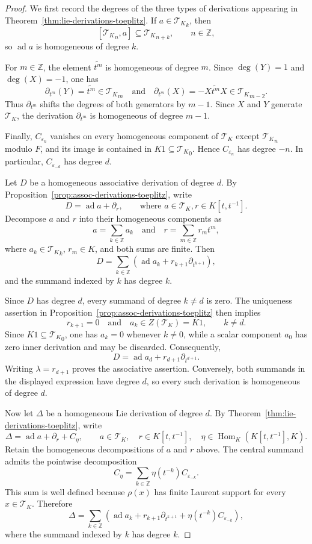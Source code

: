 \documentclass[11pt]{article}
\numberwithin{equation}{section}
\theoremstyle{plain}
\theoremstyle{definition}
\numberwithin{equation}{section}
\newcommand{\T}{\mathscr T_K}
\begin{document}
\begin{proof}
We first record the degrees of the three types of derivations appearing in Theorem~\ref{thm:lie-derivations-toeplitz}. If $a\in{\T}_k$, then
$$
[{\T}_n,a]\subseteq{\T}_{n+k},
\qquad n\in\mathbb Z,
$$
so $\operatorname{ad}a$ is homogeneous of degree $k$.

For $m\in\mathbb Z$, the element $\widetilde{t^m}$ is homogeneous of degree $m$. Since $\deg(Y)=1$ and $\deg(X)=-1$, one has
$$
\partial_{t^m}(Y)=\widetilde{t^m}\in{\T}_m
\quad\text{and}\quad
\partial_{t^m}(X)=-X\widetilde{t^m}X\in{\T}_{m-2}.
$$
Thus $\partial_{t^m}$ shifts the degrees of both generators by $m-1$. Since $X$ and $Y$ generate $\T$, the derivation $\partial_{t^m}$ is homogeneous of degree $m-1$.

Finally, $C_{\varepsilon_n}$ vanishes on every homogeneous component of $\T$ except ${\T}_n$ modulo $F$, and its image is contained in $K1\subseteq{\T}_0$. Hence $C_{\varepsilon_n}$ has degree $-n$. In particular, $C_{\varepsilon_{-d}}$ has degree $d$.

Let $D$ be a homogeneous associative derivation of degree $d$. By Proposition~\ref{prop:assoc-derivations-toeplitz}, write
$$
D=\operatorname{ad}a+\partial_r,
\qquad\text{where } a\in\T, r\in K[t,t^{-1}].
$$
Decompose $a$ and $r$ into their homogeneous components as
$$
a=\sum_{k\in\mathbb Z}a_k
\quad\text{and}\quad
r=\sum_{m\in\mathbb Z}r_mt^m,
$$
where $a_k\in{\T}_k$, $r_m\in K$, and both sums are finite. Then
$$
D=\sum_{k\in\mathbb Z}
\left(
\operatorname{ad}a_k+
r_{k+1}\partial_{t^{k+1}}
\right),
$$
and the summand indexed by $k$ has degree $k$.

Since $D$ has degree $d$, every summand of degree $k\neq d$ is zero. The uniqueness assertion in Proposition~\ref{prop:assoc-derivations-toeplitz} then implies
$$
r_{k+1}=0
\quad\text{and}\quad
a_k\in Z(\T)=K1,
\qquad k\neq d.
$$
Since $K1\subseteq{\T}_0$, one has $a_k=0$ whenever $k\neq0$, while a scalar component $a_0$ has zero inner derivation and may be discarded. Consequently,
$$
D=\operatorname{ad}a_d+r_{d+1}\partial_{t^{d+1}}.
$$
Writing $\lambda=r_{d+1}$ proves the associative assertion. Conversely, both summands in the displayed expression have degree $d$, so every such derivation is homogeneous of degree $d$.

Now let $\Delta$ be a homogeneous Lie derivation of degree $d$. By Theorem~\ref{thm:lie-derivations-toeplitz}, write
$$
\Delta=\operatorname{ad}a+\partial_r+C_\eta,
\qquad
a\in\T,\quad
r\in K[t,t^{-1}],\quad
\eta\in\operatorname{Hom}_K(K[t,t^{-1}],K).
$$
Retain the homogeneous decompositions of $a$ and $r$ above. The central summand admits the pointwise decomposition
$$
C_\eta
=
\sum_{k\in\mathbb Z}
\eta(t^{-k})C_{\varepsilon_{-k}}.
$$
This sum is well defined because $\rho(x)$ has finite Laurent support for every $x\in\T$. Therefore
$$
\Delta
=
\sum_{k\in\mathbb Z}
\left(
\operatorname{ad}a_k
+r_{k+1}\partial_{t^{k+1}}
+\eta(t^{-k})C_{\varepsilon_{-k}}
\right),
$$
where the summand indexed by $k$ has degree $k$.


\end{proof}
\end{document}
